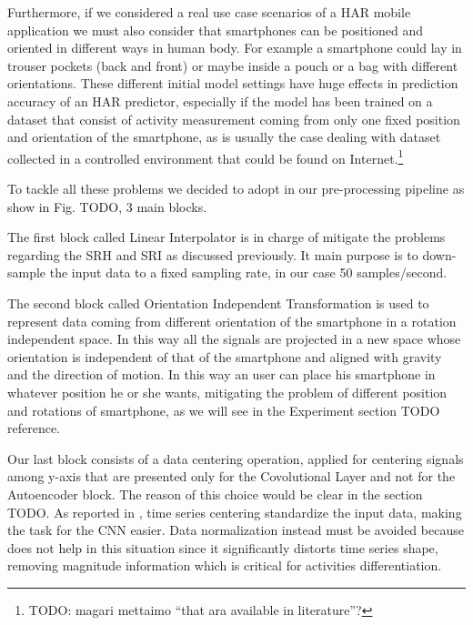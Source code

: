 Furthermore, if we considered a real use case scenarios of a HAR mobile application we must also consider that smartphones can be positioned and oriented in different ways in human body. For example a smartphone could lay in trouser pockets (back and front) or maybe inside a pouch or a bag with different orientations. These different initial model settings have huge effects in prediction accuracy of an HAR predictor, especially if the model has been trained on a dataset that consist of activity measurement coming from only one fixed position and orientation of the smartphone, as is usually the case dealing with dataset collected in a controlled environment that could be found on Internet.\footnote{TODO: magari mettaimo ``that ara available in literature''?}

To tackle all these problems we decided to adopt in our pre-processing pipeline as show in Fig. TODO, 3 main blocks.

The first block called Linear Interpolator is in charge of mitigate the problems regarding the SRH and SRI as discussed previously. It main purpose is to down-sample the input data to a fixed sampling rate, in our case 50 samples/second.

The second block called Orientation Independent Transformation is used to represent data coming from different orientation of the smartphone in a rotation independent space. In this way all the signals are projected in a new space whose orientation is independent of that of the smartphone and aligned with gravity and the direction of motion. In this way an user can place his smartphone in whatever position he or she wants, mitigating the problem of different position and rotations of smartphone, as we will see in the Experiment section TODO reference.

Our last block consists of a data centering operation, applied for centering signals among y-axis that are presented only for the Covolutional Layer and not for the Autoencoder block. The reason of this choice would be clear in the section TODO. As reported in \cite{ignatov2018real}, time series centering standardize the input data, making the task for the CNN easier. Data normalization instead must be avoided because does not help in this situation since it significantly distorts time series shape, removing magnitude information which is critical for activities differentiation.

